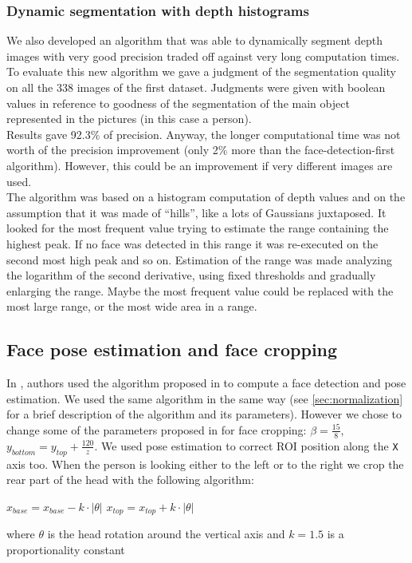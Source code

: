 \documentclass{article}
\begin{document}
\subsubsection{Dynamic segmentation with depth histograms}
We also developed an algorithm that was able to dynamically segment depth images with very good precision traded off against very long computation times. \\
To evaluate this new algorithm we gave a judgment of the segmentation quality on all the 338 images of the first dataset. Judgments were given with boolean values in reference to goodness of the segmentation of the main object represented in the pictures (in this case a person).	\\
Results gave 92.3\% of precision. Anyway, the longer computational time was not worth of the precision improvement (only 2\% more than the face-detection-first algorithm). However, this could be an improvement if very different images are used. \\
The algorithm was based on a histogram computation of depth values and on the
assumption that it was made of ``hills'', like a lots of Gaussians juxtaposed.
It looked for the most frequent value trying to estimate the range containing
the highest peak. If no face was detected in this range it was re-executed on
the second most high peak and so on. Estimation of the range was made
analyzing the logarithm of the second derivative, using fixed thresholds and
gradually enlarging the range. Maybe the most frequent value could be replaced
with the most large range, or the most wide area in a range.

\subsection{Face pose estimation and face cropping}	\label{sec:cropping}
In \citet{Hayat2016}, authors used the algorithm proposed in \citet{Fanelli2011} to compute a face detection and pose estimation. We used the same algorithm in the same way (see \ref{sec:normalization} for a brief description of the algorithm and its parameters). However we chose to change some of the parameters proposed in \citet{Hayat2016} for face cropping: $\beta = \frac{15}{8}$, $y_{bottom} = y_{top} + \frac{120}{z}$. We used pose estimation to correct ROI position along the \verb|X| axis too. When the person is looking either to the left or to the right we crop the rear part of the head with the following algorithm:
\begin{algorithm}
	\begin{algorithmic}[1]
		\State $x_{base} = x_{base} - k \cdot |\theta|$
		\Else
		\State $x_{top} = x_{top} + k \cdot |\theta|$
		\EndIf
	\end{algorithmic}
\end{algorithm}
where $\theta$ is the head rotation around the vertical axis and $k = 1.5$ is a proportionality constant
\end{document}
